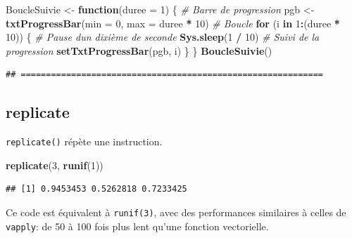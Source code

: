 \documentclass[
  12pt,
  french,
  a4paper,
  extrafontsizes,onecolumn,openright
  ]{memoir}
\newenvironment{Shaded}{\begin{snugshade}}{\end{snugshade}}
\newcommand{\AttributeTok}[1]{\textcolor[rgb]{0.13,0.29,0.53}{#1}}
\newcommand{\CommentTok}[1]{\textcolor[rgb]{0.56,0.35,0.01}{\textit{#1}}}
\newcommand{\ControlFlowTok}[1]{\textcolor[rgb]{0.13,0.29,0.53}{\textbf{#1}}}
\newcommand{\DecValTok}[1]{\textcolor[rgb]{0.00,0.00,0.81}{#1}}
\newcommand{\FunctionTok}[1]{\textcolor[rgb]{0.13,0.29,0.53}{\textbf{#1}}}
\newcommand{\NormalTok}[1]{#1}
\newcommand{\OtherTok}[1]{\textcolor[rgb]{0.56,0.35,0.01}{#1}}
\newcommand{\SpecialCharTok}[1]{\textcolor[rgb]{0.81,0.36,0.00}{\textbf{#1}}}
\newlength{\rf}
\begin{document}
\begin{Shaded}
\begin{Highlighting}[]
\NormalTok{BoucleSuivie }\OtherTok{\textless{}{-}} \ControlFlowTok{function}\NormalTok{(}\AttributeTok{duree =} \DecValTok{1}\NormalTok{) \{}
  \CommentTok{\# Barre de progression}
\NormalTok{  pgb }\OtherTok{\textless{}{-}} \FunctionTok{txtProgressBar}\NormalTok{(}\AttributeTok{min =} \DecValTok{0}\NormalTok{, }\AttributeTok{max =}\NormalTok{ duree }\SpecialCharTok{*} \DecValTok{10}\NormalTok{)}
  \CommentTok{\# Boucle}
  \ControlFlowTok{for}\NormalTok{ (i }\ControlFlowTok{in} \DecValTok{1}\SpecialCharTok{:}\NormalTok{(duree }\SpecialCharTok{*} \DecValTok{10}\NormalTok{)) \{}
    \CommentTok{\# Pause d\textquotesingle{}un dixième de seconde}
    \FunctionTok{Sys.sleep}\NormalTok{(}\DecValTok{1} \SpecialCharTok{/} \DecValTok{10}\NormalTok{)}
    \CommentTok{\# Suivi de la progression}
    \FunctionTok{setTxtProgressBar}\NormalTok{(pgb, i)}
\NormalTok{  \}}
\NormalTok{\}}
\FunctionTok{BoucleSuivie}\NormalTok{()}
\end{Highlighting}
\end{Shaded}

\begin{verbatim}
## ============================================================
\end{verbatim}

\normalsize

\subsection{replicate}\label{replicate}

\texttt{replicate()} répète une instruction.

\scriptsize

\begin{Shaded}
\begin{Highlighting}[]
\FunctionTok{replicate}\NormalTok{(}\DecValTok{3}\NormalTok{, }\FunctionTok{runif}\NormalTok{(}\DecValTok{1}\NormalTok{))}
\end{Highlighting}
\end{Shaded}

\begin{verbatim}
## [1] 0.9453453 0.5262818 0.7233425
\end{verbatim}

\normalsize

Ce code est équivalent à \texttt{runif(3)}, avec des performances similaires à celles de \texttt{vapply}: de 50 à 100 fois plus lent qu'une fonction vectorielle.
\end{document}
